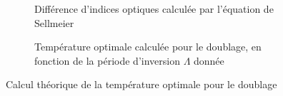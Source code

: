 \documentclass[11pt,a4paper]{article}
\newcommand{\ncite}[1]{[\citenum{#1}]}
\begin{document}
\begin{figure}[htpb] 
\centering
\hspace*{-0.8cm}
\begin{subfigure}[t]{0.48\textwidth}
	\centering
	
	\vspace{-0.5cm}
	\caption{Différence d'indices optiques calculée par l'équation de Sellmeier}
	\label{fig:sellmeier}
\end{subfigure}
\centering
\hspace*{0.8cm}
\begin{subfigure}[t]{0.48\textwidth}
	
	\vspace{-0.5cm}
	\caption{Température optimale calculée pour le doublage, en fonction de la période d'inversion $\Lambda$ donnée}
    \label{fig:lp}
\end{subfigure}
\caption{Calcul théorique de la température optimale pour le doublage}
\end{figure}


\end{document}
